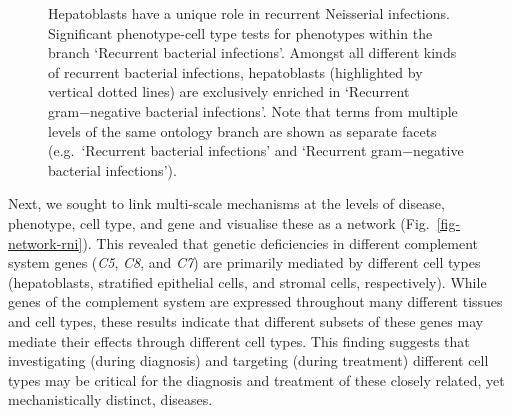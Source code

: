 \documentclass[
sn-nature
]{sn-jnl}
\begin{document}
\label{cell-fig-rni}
\begin{figure}[H]


\caption{\label{fig-rni}Hepatoblasts have a unique role in recurrent
Neisserial infections. Significant phenotype-cell type tests for
phenotypes within the branch `Recurrent bacterial infections'. Amongst
all different kinds of recurrent bacterial infections, hepatoblasts
(highlighted by vertical dotted lines) are exclusively enriched in
`Recurrent gram−negative bacterial infections'. Note that terms from
multiple levels of the same ontology branch are shown as separate facets
(e.g.~`Recurrent bacterial infections' and `Recurrent gram−negative
bacterial infections').}

\end{figure}%

Next, we sought to link multi-scale mechanisms at the levels of disease,
phenotype, cell type, and gene and visualise these as a network
(Fig.~\ref{fig-network-rni}). This revealed that genetic deficiencies in
different complement system genes (\emph{C5}, \emph{C8}, and \emph{C7})
are primarily mediated by different cell types (hepatoblasts, stratified
epithelial cells, and stromal cells, respectively). While genes of the
complement system are expressed throughout many different tissues and
cell types, these results indicate that different subsets of these genes
may mediate their effects through different cell types. This finding
suggests that investigating (during diagnosis) and targeting (during
treatment) different cell types may be critical for the diagnosis and
treatment of these closely related, yet mechanistically distinct,
diseases.
\end{document}
